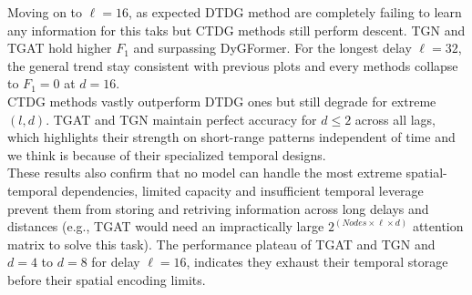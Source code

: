 Moving on to $\ell=16$, as expected DTDG method are completely failing to learn any information for this taks but CTDG methods still perform descent. 
TGN and TGAT hold higher $F_1$ and surpassing DyGFormer.
For the longest delay $\ell=32$, the general trend stay consistent with previous plots and every methods collapse to $F_1=0$ at $d=16$. \\
CTDG methods vastly outperform DTDG ones but still degrade for extreme $(l, d)$. TGAT and TGN maintain perfect accuracy for $d \leq 2$ across all lags, which highlights their strength on short-range patterns independent of time and we think is because of their specialized temporal designs. \\ 
These results also confirm that no model can handle the most extreme spatial-temporal dependencies, limited capacity and insufficient temporal leverage prevent them from storing and retriving information across long delays and distances (e.g., TGAT would need an impractically large $2^{(\textit{Nodes} \times \ell \times d)}$ attention matrix to solve this task). 
The performance plateau of TGAT and TGN and $d=4$ to $d=8$ for delay $\ell=16$, indicates they exhaust their temporal storage before their spatial encoding limits.

